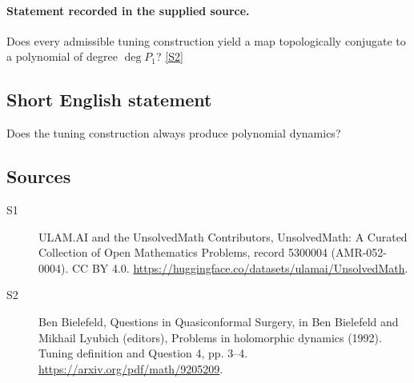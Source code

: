 \documentclass[11pt]{article}
\newcommand{\sref}[2]{\hyperlink{source:#1:#2}{[S#2]}}
\begin{document}
\paragraph{Statement recorded in the supplied source.}
Does every admissible tuning construction yield a map topologically conjugate to a polynomial of degree $\deg P_1$? \sref{5300004}{2}
\subsection{Short English statement}
Does the tuning construction always produce polynomial dynamics?
\subsection{Sources}
\begin{description}
\item[\hypertarget{source:5300004:1}{S1}] ULAM.AI and the UnsolvedMath Contributors, UnsolvedMath: A Curated Collection of Open Mathematics Problems, record 5300004 (AMR-052-0004). CC BY 4.0. \url{https://huggingface.co/datasets/ulamai/UnsolvedMath}.
\item[\hypertarget{source:5300004:2}{S2}] Ben Bielefeld, Questions in Quasiconformal Surgery, in Ben Bielefeld and Mikhail Lyubich (editors), Problems in holomorphic dynamics (1992). Tuning definition and Question 4, pp. 3–4. \url{https://arxiv.org/pdf/math/9205209}.
\end{description}
\label{end:5300004}
\end{document}
